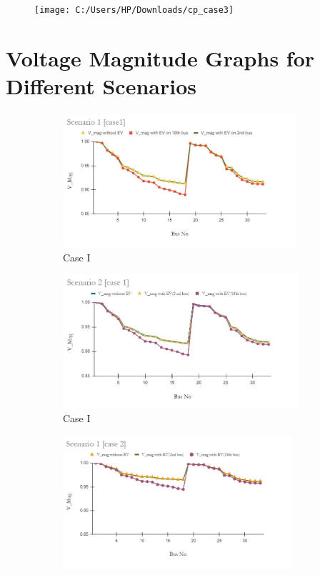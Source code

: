 			\begin{figure}
				\centering
				\texttt{[image: C:/Users/HP/Downloads/cp\_case3]}
				\caption{}
				\label{fig:cpcase3}
			\end{figure}
			
			
			
			
			
			
			
	\section{Voltage Magnitude Graphs for Different Scenarios}
	
	 \begin{figure}[!h]
		\begin{subfigure}{.5\textwidth}
			\centering
			\includegraphics[width=.97\linewidth,height= 4.95cm]{./Figures/sc1_case1}  
			\caption{Case I}
			\label{fig:LFa}
		\end{subfigure}
		\begin{subfigure}{.5\textwidth}
			\centering
			\includegraphics[width=.97\linewidth,height= 4.95cm]{./Figures/sc2_case1}  
			\caption{Case I}
			\label{fig:LF2a}
		\end{subfigure}
		\begin{subfigure}{.5\textwidth}
			\centering
			\includegraphics[width=.97\linewidth,height= 4.95cm]{./Figures/sc1_case2}

\end{subfigure}
\end{figure}
